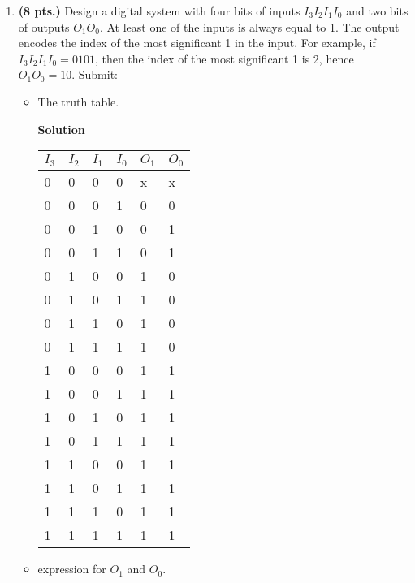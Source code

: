 \begin{enumerate}
\item  \textbf{ (8 pts.)} Design a digital system with four bits of inputs 
$I_3 I_2 I_1 I_0$ and two bits of outputs $O_1 O_0$.  At least one
of the inputs is always equal to 1.  The output encodes the 
index of the most significant 1 in the input.
For example, if $I_3 I_2 I_1 I_0 = 0101$, then the index
of the most significant 1 is 2, hence $O_1 O_0 = 10$.  Submit:
\begin{itemize}
\item The truth table.

\begin{onlysolution}  \textbf{Solution} \itshape{
	\begin{tabular}{l|l|l|l||l|l}
	$I_3$ & $I_2$ & $I_1$ & $I_0$ & $O_1$ & $O_0$ \\ \hline
	0 & 0 & 0 & 0 &  x & x \\ \hline
	0 & 0 & 0 & 1 &  0 & 0 \\ \hline
	0 & 0 & 1 & 0 &  0 & 1 \\ \hline
	0 & 0 & 1 & 1 &  0 & 1 \\ \hline
	0 & 1 & 0 & 0 &  1 & 0 \\ \hline
	0 & 1 & 0 & 1 &  1 & 0 \\ \hline
	0 & 1 & 1 & 0 &  1 & 0 \\ \hline
	0 & 1 & 1 & 1 &  1 & 0 \\ \hline
	1 & 0 & 0 & 0 &  1 & 1 \\ \hline
	1 & 0 & 0 & 1 &  1 & 1 \\ \hline
	1 & 0 & 1 & 0 &  1 & 1 \\ \hline
	1 & 0 & 1 & 1 &  1 & 1 \\ \hline
	1 & 1 & 0 & 0 &  1 & 1 \\ \hline
	1 & 1 & 0 & 1 &  1 & 1 \\ \hline
	1 & 1 & 1 & 0 &  1 & 1 \\ \hline
	1 & 1 & 1 & 1 &  1 & 1 \\ 
	\end{tabular}
} \end{onlysolution} 
\item \SOPmin expression for $O_1$ and $O_0$.


\end{itemize}
\end{enumerate}
